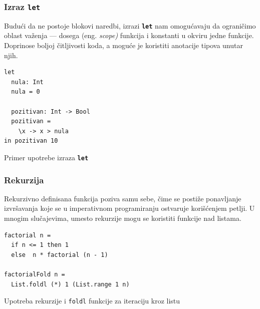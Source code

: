 \documentclass[12pt,oneside]{memoir}
\begin{document}
\subsubsection{Izraz \texttt{\textbf{let}}}
Budući da ne postoje blokovi naredbi, izrazi \texttt{\textbf{let}} nam omogućavaju da 
ograničimo oblast važenja --- dosega (eng. \emph{scope)} funkcija i konstanti u okviru
jedne funkcije. Doprinose boljoj čitljivosti koda, a moguće je koristiti anotacije tipova
unutar njih.
\begin{listing}[h]
\begin{verbatim}
let
  nula: Int
  nula = 0
  
  pozitivan: Int -> Bool
  pozitivan =
    \x -> x > nula
in pozitivan 10
\end{verbatim}
\caption{Primer upotrebe izraza \texttt{\textbf{let}}}
\end{listing}
\subsubsection{Rekurzija}
Rekurzivno definisana funkcija poziva samu sebe, čime se postiže ponavljanje izvršavanja
koje se u imperativnom programiranju ostvaruje korišćenjem petlji. U mnogim slučajevima,
umesto rekurzije mogu se koristiti funkcije nad listama.
\begin{listing}[h]
\begin{verbatim}
factorial n = 
  if n <= 1 then 1 
  else  n * factorial (n - 1)

factorialFold n = 
  List.foldl (*) 1 (List.range 1 n) 
\end{verbatim}
\caption{Upotreba rekurzije i \texttt{foldl} funkcije za iteraciju kroz listu}
\end{listing}
\end{document}
